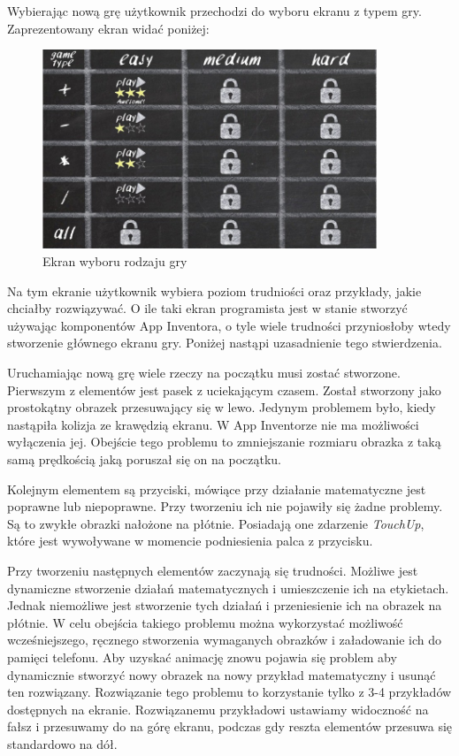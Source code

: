 Wybierając nową grę użytkownik przechodzi do wyboru ekranu z typem gry. Zaprezentowany ekran widać poniżej:

\begin{figure}[H]
\centering\includegraphics[width=10cm]{figures/apps/thinkfaster_gametype}
\caption{Ekran wyboru rodzaju gry}
\end{figure}

Na tym ekranie użytkownik wybiera poziom trudniości oraz przykłady, jakie chciałby rozwiązywać. O ile taki ekran programista jest w stanie stworzyć używając komponentów App Inventora, o tyle wiele trudności przyniosłoby wtedy stworzenie głównego ekranu gry. Poniżej nastąpi uzasadnienie tego stwierdzenia.

Uruchamiając nową grę wiele rzeczy na początku musi zostać stworzone. Pierwszym z elementów jest pasek z uciekającym czasem. Został stworzony jako prostokątny obrazek przesuwający się w lewo. Jedynym problemem było, kiedy nastąpiła kolizja ze krawędzią ekranu. W App Inventorze nie ma możliwości wyłączenia jej. Obejście tego problemu to zmniejszanie rozmiaru obrazka z taką samą prędkością jaką poruszał się on na początku.

Kolejnym elementem są przyciski, mówiące przy działanie matematyczne jest poprawne lub niepoprawne. Przy tworzeniu ich nie pojawiły się żadne problemy. Są to zwykłe obrazki nałożone na płótnie. Posiadają one zdarzenie \emph{TouchUp}, które jest wywoływane w momencie podniesienia palca z przycisku.

Przy tworzeniu następnych elementów zaczynają się trudności. Możliwe jest dynamiczne stworzenie działań matematycznych i umieszczenie ich na etykietach. Jednak niemożliwe jest stworzenie tych działań i przeniesienie ich na obrazek na płótnie. W celu obejścia takiego problemu można wykorzystać możliwość wcześniejszego, ręcznego stworzenia wymaganych obrazków i załadowanie ich do pamięci telefonu. Aby uzyskać animację znowu pojawia się problem aby dynamicznie stworzyć nowy obrazek na nowy przykład matematyczny i usunąć ten rozwiązany. Rozwiązanie tego problemu to korzystanie tylko z 3-4 przykładów dostępnych na ekranie. Rozwiązanemu przykładowi ustawiamy widoczność na fałsz i przesuwamy do na górę ekranu, podczas gdy reszta elementów przesuwa się standardowo na dół.

